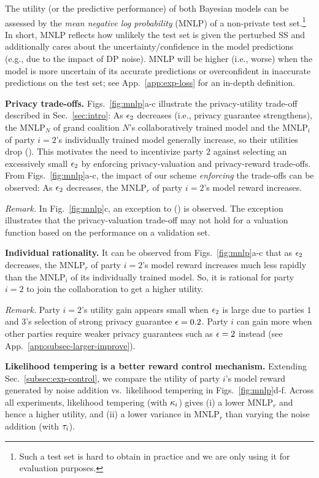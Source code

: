 \documentclass{article}
\DeclareRobustCommand{\hlp}[1]
{{#1}}
\theoremstyle{plain}
\theoremstyle{definition}
\theoremstyle{remark}
\begin{document}
The utility (or the predictive performance) of both Bayesian models can be assessed by the \emph{mean negative log probability} (MNLP) of a non-private test set.\footnote{Such a test set is hard to obtain in practice and we are only using it for evaluation purposes.} \hlp{In short, MNLP reflects how unlikely the test set is given the perturbed SS and additionally cares about the uncertainty/confidence in the model predictions (e.g., due to the impact of DP noise). MNLP will be higher (i.e., worse) when the model is more uncertain of its accurate predictions or overconfident in inaccurate predictions on the test set}; see App.~\ref{app:exp-loss} for an in-depth definition. 

\noindent\textbf{Privacy trade-offs.} 
Figs.~\ref{fig:mnlp}a-c illustrate the privacy-utility trade-off described in Sec.~\ref{sec:intro}: As ${\epsilon}_2$ decreases (i.e., privacy guarantee strengthens), the {MNLP}$_N$ of grand coalition $N$'s collaboratively trained model and the {MNLP}$_i$ of party $i=2$'s individually trained model generally increase, so their utilities drop (\textdagger). This motivates the need to incentivize party $2$ against selecting an excessively small ${\epsilon}_2$ by enforcing privacy-valuation and privacy-reward trade-offs. 
From Figs.~\ref{fig:mnlp}a-c, the impact of our scheme \emph{enforcing} the trade-offs can be observed: As ${\epsilon}_2$ decreases, the {MNLP}$_r$ of party $i=2$'s model reward increases.

\hlp{\emph{Remark.}  In Fig.~{\ref{fig:mnlp}}c, an exception to (\textdagger) is observed. The exception illustrates that the privacy-valuation trade-off may not hold for a valuation function based on the performance on a validation set.}

\noindent\textbf{Individual rationality.} 
It can be observed from Figs.~\ref{fig:mnlp}a-c that as ${\epsilon}_2$ decreases, the {MNLP}$_r$ of party $i=2$'s model reward increases much less rapidly than the {MNLP}$_i$ of its individually trained model. So, it is rational for party $i=2$ to join the collaboration to get a higher utility.

\hlp{\emph{Remark.} Party $i=2$'s utility gain appears small when ${\epsilon}_2$ is large due to parties $1$ and $3$'s selection of strong privacy guarantee ${\epsilon} = 0.2$. Party $i$ can gain more when other parties require weaker privacy guarantees such as ${\epsilon} = 2$ instead} (see App.~\ref{app:subsec-larger-improve}).

\noindent\textbf{Likelihood tempering is a better reward control mechanism.} 
Extending Sec.~\ref{subsec:exp-control}, we compare the utility of party $i$'s model reward generated by noise addition vs.~likelihood tempering in Figs.~\ref{fig:mnlp}d-f. Across all experiments, likelihood tempering (with ${\kappa_i}$) gives (i) a lower {MNLP}$_r$ and hence a higher utility, and (ii) a lower variance in {MNLP}$_r$ than varying the noise addition (with ${\tau_i}$).
\end{document}
